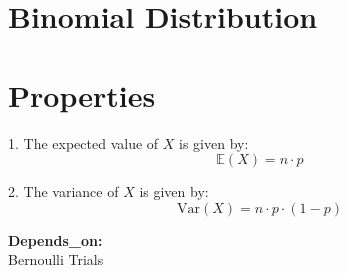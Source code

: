 \documentclass{article}
\begin{document}
\section*{Binomial Distribution}

\section*{Properties}

1. The expected value of \( X \) is given by:
   \[
   \mathbb{E}(X) = n \cdot p
   \]

2. The variance of \( X \) is given by:
   \[
   \text{Var}(X) = n \cdot p \cdot (1 - p)
   \]

\textbf{Depends\_on:} \\
Bernoulli Trials
\end{document}
